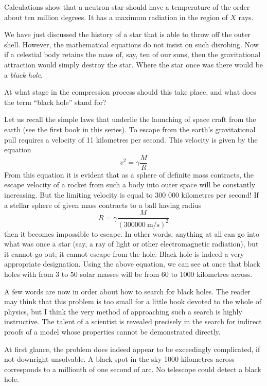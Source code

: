 Calculations show that a neutron star should have a temperature of the order about ten million degrees. It has a maximum radiation in the region of $X$ rays.

We have just discussed the history of a star that is able to throw off the outer shell. However, the mathemat­ical equations do not insist on such disrobing. Now if a celestial body retains the mass of, say, ten of our suns, then the gravitational attraction would simply destroy the star. Where the star once was there would be a \emph{black hole}.

At what stage in the compression process should this take place, and what does the term ``black hole'' stand for?

Let us recall the simple laws that underlie the launching of space craft from the earth (see the first book in this series). To escape from the earth's gravitational pull requires a velocity of 11 kilometres per second. This velocity is given by the equation
\begin{equation*}%
v^{2} = \gamma \frac{M}{R}
\end{equation*}
From this equation it is evident that as a sphere of definite mass contracts, the escape velocity of a rocket from such a body into outer space will be constantly increasing. But the limiting velocity is equal to 300 000 kilometres per second! If a stellar sphere of given mass contracts to a ball having radius
\begin{equation*}%
R = \gamma \frac{M}{(\SI{300000}{\metre\per\second})^{2}}
\end{equation*}
then it becomes impossible to escape. In other words, anything at all can go into what was once a star (say, a ray of light or other electromagnetic radiation), but it cannot go out; it cannot escape from the hole. Black hole is indeed a very appropriate designation. Using the above equation, we can see at once that black holes with from 3 to 50 solar masses will be from 60 to 1000 kilo­metres across.

A few words are now in order about how to search for black holes. The reader may think that this problem is too small for a little book devoted to the whole of physics, but I think the very method of approaching such a search is highly instructive. The talent of a scientist is revealed precisely in the search for indirect proofs of a model whose properties cannot be demonstrated directly.

At first glance, the problem does indeed appear to be exceedingly complicated, if not downright unsolvable. A black spot in the sky 1000 kilometres across corresponds to a millionth of one second of arc. No telescope could detect a black hole.


